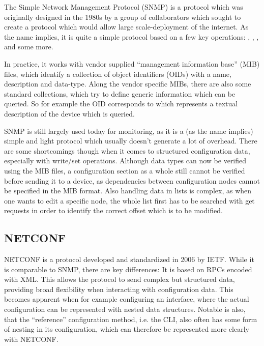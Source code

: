 The Simple Network Management Protocol (SNMP)\cite{fedor_simple_1990} is a protocol which was originally
designed in the 1980s by a group of collaborators which sought to create a protocol which would
allow large scale-deployment of the internet.
As the name implies, it is quite a simple protocol based on a few key operations:
, , ,  and some more.

In practice, it works with vendor supplied ``management information base'' (MIB) files, which identify a collection
of object identifiers (OIDs) with a name, description and data-type. 
Along the vendor specific MIBs, there are also some standard collections,
which try to define generic information which can be queried.
So for example the OID  corresponds to 
which represents a textual description of the device which is queried.

SNMP is still largely used today for monitoring, as it is a (as the name implies) simple and light protocol
which usually doesn't generate a lot of overhead. There are some shortcomings though when it comes to
structured configuration data, especially with write/set operations. Although data types can now be verified
using the MIB files, a configuration section as a whole still cannot be verified before sending it to a device,
as dependencies between configuration nodes cannot be specified in the MIB format. Also handling data
in lists is complex, as when one wants to edit a specific node, the whole list first has to be searched
with get requests in order to identify the correct offset which is to be modified.

\subsection{NETCONF}

NETCONF is a protocol developed and standardized in 2006  by \acrshort{IETF}.
While it is comparable to SNMP, there are key differences:
It is based on \acrfull{RPC}s encoded with XML.
This allows the protocol to send complex but structured data, providing broad flexibility
when interacting with configuration data. 
This becomes apparent when for example configuring an interface, where the actual configuration
can be represented with nested data structures.
Notable is also, that the ``reference'' configuration method, i.e. the CLI, also often has some form
of nesting in its configuration, which can therefore be represented more clearly with NETCONF.


